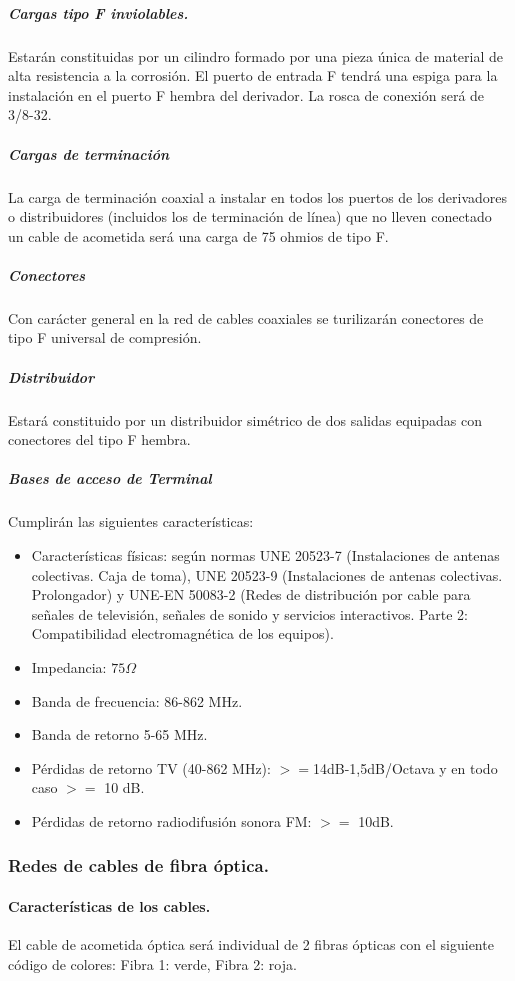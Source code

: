 \subparagraph{Cargas tipo F inviolables.}
Estarán constituidas por un cilindro formado por una pieza única de material de alta resistencia a la corrosión. El puerto de entrada F tendrá una espiga para la instalación en el puerto F hembra del derivador. La rosca de conexión será de 3/8-32.

\subparagraph{Cargas de terminación}
La carga de terminación coaxial a instalar en todos los puertos de los derivadores o distribuidores (incluidos los de terminación de línea) que no lleven conectado un cable de acometida será una carga de 75 ohmios de tipo F.

\subparagraph{Conectores}
Con carácter general en la red de cables coaxiales se turilizarán conectores de tipo F universal de compresión.

\subparagraph{Distribuidor}
Estará constituido por un distribuidor simétrico de dos salidas equipadas con conectores del tipo F hembra.

\subparagraph{Bases de acceso de Terminal}
Cumplirán las siguientes características:

\begin{itemize} 
	\item Características físicas: según normas UNE 20523-7 (Instalaciones de antenas colectivas. Caja de toma), UNE 20523-9 (Instalaciones de antenas colectivas. Prolongador) y UNE-EN 50083-2 (Redes de distribución por cable para señales de televisión, señales de sonido y servicios interactivos. Parte 2: Compatibilidad electromagnética de los equipos).
	\item Impedancia: $75\Omega$
	\item Banda de frecuencia: 86-862 MHz.
	\item Banda de retorno 5-65 MHz.
	\item Pérdidas de retorno TV (40-862 MHz): $>=$14dB-1,5dB/Octava y en todo caso $>=$ 10 dB.
	\item Pérdidas de retorno radiodifusión sonora FM: $>=$ 10dB.
\end{itemize}
\subsubsection{Redes de cables de fibra óptica.}
\paragraph{Características de los cables.}
El cable de acometida óptica será individual de 2 fibras ópticas con el siguiente código de colores: Fibra 1: verde, Fibra 2: roja.


